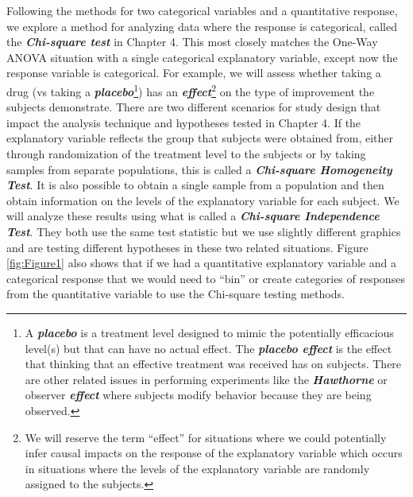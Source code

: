 \documentclass[]{book}
\let\rmarkdownfootnote\footnote%
\def\footnote{\protect\rmarkdownfootnote}
\begin{document}
Following the methods for two categorical variables and a quantitative
response, we explore a method for analyzing data where the response is
categorical, called the \textbf{\emph{Chi-square test}} in Chapter 4.
This most closely matches the One-Way ANOVA situation with a single
categorical explanatory variable, except now the response variable is
categorical. For example, we will assess whether taking a drug (vs
taking a \textbf{\emph{placebo}}\footnote{A \textbf{\emph{placebo}} is a
  treatment level designed to mimic the potentially efficacious level(s)
  but that can have no actual effect. The \textbf{\emph{placebo effect}}
  is the effect that thinking that an effective treatment was received
  has on subjects. There are other related issues in performing
  experiments like the \textbf{\emph{Hawthorne}} or observer
  \textbf{\emph{effect}} where subjects modify behavior because they are
  being observed.}) has an \textbf{\emph{effect}}\footnote{We will
  reserve the term ``effect'' for situations where we could potentially
  infer causal impacts on the response of the explanatory variable which
  occurs in situations where the levels of the explanatory variable are
  randomly assigned to the subjects.} on the type of improvement the
subjects demonstrate. There are two different scenarios for study design
that impact the analysis technique and hypotheses tested in Chapter 4.
If the explanatory variable reflects the group that subjects were
obtained from, either through randomization of the treatment level to
the subjects or by taking samples from separate populations, this is
called a \textbf{\emph{Chi-square Homogeneity Test}}. It is also
possible to obtain a single sample from a population and then obtain
information on the levels of the explanatory variable for each subject.
We will analyze these results using what is called a
\textbf{\emph{Chi-square Independence Test}}. They both use the same
test statistic but we use slightly different graphics and are testing
different hypotheses in these two related situations. Figure
\ref{fig:Figure1} also shows that if we had a quantitative explanatory
variable and a categorical response that we would need to ``bin'' or
create categories of responses from the quantitative variable to use the
Chi-square testing methods.
\end{document}
